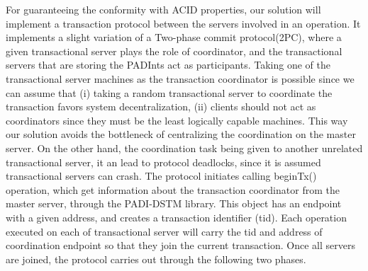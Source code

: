 \documentclass[times, 10pt,twocolumn]{article}
\begin{document}
For guaranteeing the conformity with ACID properties, our solution will implement a transaction protocol between the servers involved in an operation. It implements a slight variation of a Two-phase commit protocol(2PC), where a given transactional server plays the role of coordinator, and the transactional servers that are storing the PADInts act as participants. Taking one of the transactional server machines as the transaction coordinator is possible since we can assume that (i) taking a random transactional server to coordinate the transaction favors system decentralization, (ii) clients should not act as coordinators since they must be the least logically capable machines. This way our solution avoids the bottleneck of centralizing the coordination on the master server. On the other hand, the coordination task being given to another unrelated transactional server, it an lead to protocol deadlocks, since it is assumed transactional servers can crash.
The protocol initiates calling beginTx() operation, which get information about the transaction coordinator from the master server, through the PADI-DSTM library. This object has an endpoint with a given address, and creates a transaction identifier (tid). Each operation executed on each of transactional server will carry the tid and address of coordination endpoint so that they join the current transaction. Once all servers are joined, the protocol carries out through the following two phases.
\end{document}

